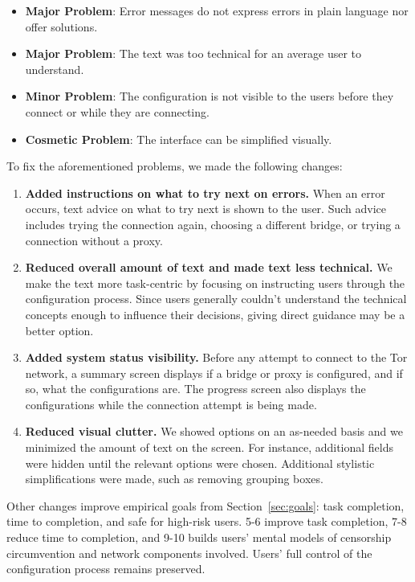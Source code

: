 \documentclass[USenglish,oneside,twocolumn]{article}
\begin{document}
\begin{itemize}
\item {\bfseries Major Problem}: Error messages do not express errors in plain language nor offer solutions. 
\item {\bfseries Major Problem}: The text was too technical for an average user to understand. 
\item {\bfseries Minor Problem}: The configuration is not visible to the users before they connect or while they are connecting.
\item {\bfseries Cosmetic Problem}: The interface can be simplified visually.  
 \end{itemize} 

To fix the aforementioned problems, we made the following changes: \\

\begin{enumerate}
\item {\bfseries Added instructions on what to try next on errors.} When an error occurs, text advice on what to try next is shown to the user. Such advice includes trying the connection again, choosing a different bridge, or trying a connection without a proxy. 
\item {\bfseries Reduced overall amount of text and made text less technical.} We make the text more task-centric by focusing on instructing users through the configuration process. Since users generally couldn't understand the technical concepts enough to influence their decisions, giving direct guidance may be a better option. 
\item {\bfseries Added system status visibility.} Before any attempt to connect to the Tor network, a summary screen displays if a bridge or proxy is configured, and if so, what the configurations are. The progress screen also displays the configurations while the connection attempt is being made. 
\item {\bfseries Reduced visual clutter.} We showed options on an as-needed basis and we minimized the amount of text on the screen. For instance, additional fields were hidden until the relevant options were chosen. Additional stylistic simplifications were made, such as removing grouping boxes. 
\end{enumerate} 

Other changes improve empirical goals from Section~\ref{sec:goals}: task completion, time to completion, and safe for high-risk users. 5-6 improve task completion, 7-8 reduce time to completion, and 9-10 builds users' mental models of censorship circumvention and network components involved. Users' full control of the configuration process remains preserved.\\
\end{document}
